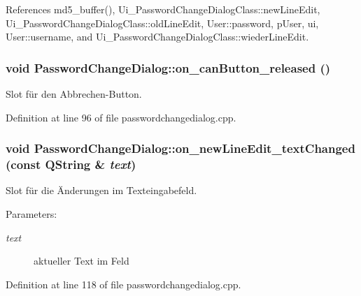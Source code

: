 References md5\_\-buffer(), Ui\_\-PasswordChangeDialogClass::newLineEdit, Ui\_\-PasswordChangeDialogClass::oldLineEdit, User::password, pUser, ui, User::username, and Ui\_\-PasswordChangeDialogClass::wiederLineEdit.\hypertarget{class_password_change_dialog_b9ca3366f45f33030f996a7f48b167eb}{
\subsubsection[on\_\-canButton\_\-released]{\setlength{\rightskip}{0pt plus 5cm}void PasswordChangeDialog::on\_\-canButton\_\-released ()}}
\label{class_password_change_dialog_b9ca3366f45f33030f996a7f48b167eb}


Slot für den Abbrechen-Button. 



Definition at line 96 of file passwordchangedialog.cpp.\hypertarget{class_password_change_dialog_73aab90dfad0af6bb73e7df28eb0932e}{
\subsubsection[on\_\-newLineEdit\_\-textChanged]{\setlength{\rightskip}{0pt plus 5cm}void PasswordChangeDialog::on\_\-newLineEdit\_\-textChanged (const QString \& {\em text})}}
\label{class_password_change_dialog_73aab90dfad0af6bb73e7df28eb0932e}


Slot für die Änderungen im Texteingabefeld. 

\begin{Desc}
\item[Parameters:]
\begin{description}
\item[{\em text}]aktueller Text im Feld \end{description}
\end{Desc}


Definition at line 118 of file passwordchangedialog.cpp.

